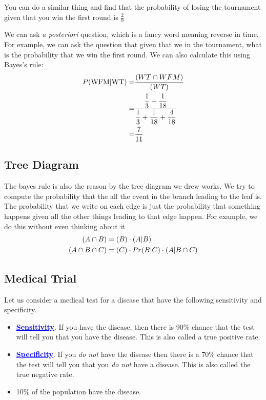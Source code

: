\documentclass[a4paper, 12pt]{article}
\newcommand{\kwd}[1]{\textcolor{blue}{\textbf{\underline{#1}}}}
\let\Pr\relax
\DeclareMathOperator{\Pr}{Pr}
\begin{document}
\begin{multicols}{2}
You can do a similar thing and find that the probability of losing the tournament given that you win the first round is $\displaystyle \frac{2}{9}$

We can ask \emph{a posteriori} question, which is a fancy word meaning reverse in time. For example, we can ask the question that given that we in the tournament, what is the probability that we win the first round. We can also calculate this using Bayes's rule:
\begin{align*}
	P(\text{WFM}|\text{WT}) =& \frac{\Pr(WT \cap WFM)}{\Pr(WT)}\\
	=& \frac{\displaystyle \frac{1}{3} + \frac{1}{18}}{\displaystyle \frac{1}{3} + \frac{1}{18} + \frac{4}{18}}\\
	=& \frac{7}{11}
\end{align*}




\subsection*{Tree Diagram}
The bayes rule is also the reason by the tree diagram we drew works. We try to compute the probability that the all the event in the branch leading to the leaf is. The probability that we write on each edge is just the probability that something happens given all the other things leading to that edge happen. For example, we do this without even thinking about it
\begin{align*}
	\Pr(A \cap B) &= \Pr(B) \cdot \Pr(A|B)\\
	\Pr(A \cap B \cap C) &= \Pr(C) \cdot Pr(B|C) \cdot \Pr(A | B \cap C)
\end{align*}


\subsection*{Medical Trial}

Let us consider a medical test for a disease that have the following sensitivity and specificity.
\begin{itemize}
	\item \kwd{Sensitivity}. If you have the disease, then there is 90\% chance that the test will tell you that you have the disease. This is also called a true positive rate.
	\item \kwd{Specificity}. If you \emph{do not} have the disease then there is a 70\% chance that the test will tell you that you \emph{do not} have a disease. This is also called the true negative rate.
	\item 10\% of the population have the disease.
\end{itemize}


\end{multicols}
\end{document}
